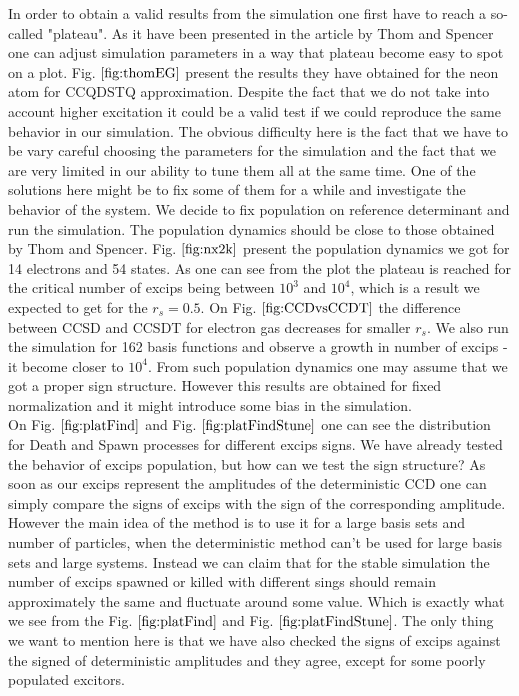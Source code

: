 In order to obtain a valid results from the simulation one first have to reach a so-called "plateau". As it have been presented in the article by Thom and Spencer \cite{spencerDevelopmentsStochasticCoupled2016} one can adjust simulation parameters in a way that plateau become easy to spot on a plot. Fig. $\ref{fig:thomEG}$ present the results they have obtained for the neon atom for CCQDSTQ approximation. Despite the fact that we do not take into account higher excitation it could be a valid test if we could reproduce the same behavior in our simulation. The obvious difficulty here is the fact that we have to be vary careful choosing the parameters for the simulation and the fact that we are very limited in our ability to tune them all at the same time. One of the solutions here might be to fix some of them for a while and investigate the behavior of the system. We decide to fix population on reference determinant and run the simulation. The population dynamics should be close to those obtained by Thom and Spencer. Fig. $\ref{fig:nx2k}$ present the population dynamics we got for 14 electrons and 54 states. As one can see from the plot the plateau is reached for the critical number of excips being between $10^3$ and $10^4$, which is a result we expected to get for the $r_s=0.5$. On Fig. $\ref{fig:CCDvsCCDT}$ the difference between CCSD and CCSDT for electron gas decreases for smaller $r_s$. We also run the simulation for 162 basis functions and observe a growth in number of excips - it become closer to $10^4$. From such population dynamics one may assume that we got a proper sign structure. However this results are obtained for fixed normalization and it might introduce some bias in the simulation. \\
On Fig. $\ref{fig:platFind}$ and Fig. $\ref{fig:platFindStune}$ one can see the distribution for Death and Spawn processes for different excips signs. We have already tested the behavior of excips population, but how can we test the sign structure? As soon as our excips represent the amplitudes of the deterministic CCD one can simply compare the signs of excips with the sign of the corresponding amplitude. However the main idea of the method is to use it for a large basis sets and number of particles, when the deterministic method can't be used for large basis sets and large systems. Instead we can claim that for the stable simulation the number of excips spawned or killed with different sings should remain approximately the same and fluctuate around some value. Which is exactly what we see from the Fig. $\ref{fig:platFind}$ and Fig. $\ref{fig:platFindStune}$. The only thing we want to mention here is that we have also checked the signs of excips against the signed of deterministic amplitudes and they agree, except for some poorly populated excitors.\\



